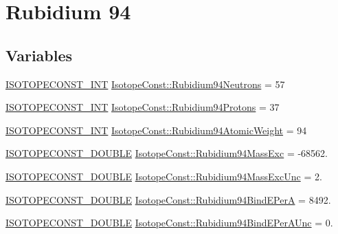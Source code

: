 \hypertarget{group___isotope_const-_rubidium-_rb94}{}\section{Rubidium 94}
\label{group___isotope_const-_rubidium-_rb94}
\subsection*{Variables}
\begin{DoxyCompactItemize}
\item 
\mbox{\hyperlink{group___isotope_const-_macros_ga5f18360b3e99483a35c32d789e62621c}{I\+S\+O\+T\+O\+P\+E\+C\+O\+N\+S\+T\+\_\+\+I\+NT}} \mbox{\hyperlink{group___isotope_const-_rubidium-_rb94_gae7fdb1e383781569bc51af4a0990224d}{Isotope\+Const\+::\+Rubidium94\+Neutrons}} = 57
\item 
\mbox{\hyperlink{group___isotope_const-_macros_ga5f18360b3e99483a35c32d789e62621c}{I\+S\+O\+T\+O\+P\+E\+C\+O\+N\+S\+T\+\_\+\+I\+NT}} \mbox{\hyperlink{group___isotope_const-_rubidium-_rb94_ga416802a4623546079af7021aeabbf1d1}{Isotope\+Const\+::\+Rubidium94\+Protons}} = 37
\item 
\mbox{\hyperlink{group___isotope_const-_macros_ga5f18360b3e99483a35c32d789e62621c}{I\+S\+O\+T\+O\+P\+E\+C\+O\+N\+S\+T\+\_\+\+I\+NT}} \mbox{\hyperlink{group___isotope_const-_rubidium-_rb94_gae9941cd08dd8e3ce7c5286e389e491c8}{Isotope\+Const\+::\+Rubidium94\+Atomic\+Weight}} = 94
\item 
\mbox{\hyperlink{group___isotope_const-_macros_ga8f45a7272ce02c0b4c65c44636ed719a}{I\+S\+O\+T\+O\+P\+E\+C\+O\+N\+S\+T\+\_\+\+D\+O\+U\+B\+LE}} \mbox{\hyperlink{group___isotope_const-_rubidium-_rb94_ga05ccaf4888e8777e30a97e8972f9d279}{Isotope\+Const\+::\+Rubidium94\+Mass\+Exc}} = -\/68562.
\item 
\mbox{\hyperlink{group___isotope_const-_macros_ga8f45a7272ce02c0b4c65c44636ed719a}{I\+S\+O\+T\+O\+P\+E\+C\+O\+N\+S\+T\+\_\+\+D\+O\+U\+B\+LE}} \mbox{\hyperlink{group___isotope_const-_rubidium-_rb94_ga61871e4fada4ee0522d5a1b297881459}{Isotope\+Const\+::\+Rubidium94\+Mass\+Exc\+Unc}} = 2.
\item 
\mbox{\hyperlink{group___isotope_const-_macros_ga8f45a7272ce02c0b4c65c44636ed719a}{I\+S\+O\+T\+O\+P\+E\+C\+O\+N\+S\+T\+\_\+\+D\+O\+U\+B\+LE}} \mbox{\hyperlink{group___isotope_const-_rubidium-_rb94_gadcef52391749154ac63da4eb3e40d8c8}{Isotope\+Const\+::\+Rubidium94\+Bind\+E\+PerA}} = 8492.
\item 
\mbox{\hyperlink{group___isotope_const-_macros_ga8f45a7272ce02c0b4c65c44636ed719a}{I\+S\+O\+T\+O\+P\+E\+C\+O\+N\+S\+T\+\_\+\+D\+O\+U\+B\+LE}} \mbox{\hyperlink{group___isotope_const-_rubidium-_rb94_ga0ec5764df4c47758e4ccf72156bbcd2f}{Isotope\+Const\+::\+Rubidium94\+Bind\+E\+Per\+A\+Unc}} = 0.

\end{DoxyCompactItemize}
